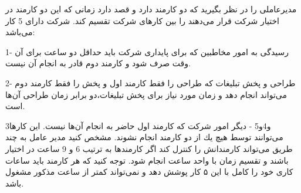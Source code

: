 \p
مدیرعاملی را در نظر بگیرید که دو کارمند دارد و قصد دارد زمانی که این دو کارمند در اختیار شرکت قرار می‌دهند را بین کار‌های شرکت تقسیم کند. شرکت دارای 5 کار می‌باشد:

1- رسیدگی به امور مخاطبین که برای پایداری شرکت باید حداقل دو ساعت برای آن وقت صرف شود و کارمند دوم قادر به انجام آن نیست.

2- طراحی و پخش تبلیغات که طراحی را فقط کارمند اول و پخش را فقط کارمند دوم می‌تواند انجام دهد و زمان مورد نیاز برای پخش تبلیغات،دو برابر زمان طراحی آن‌ها است.

3و4و5 - دیگر امور شرکت که کارمند اول حاضر به انجام آن‌ها نیست.
این کارها می‌توانند توسط هيچ يك از دو كارمند انجام نشوند.
\p
مشخص کنید مدیر عامل به چند طریق می‌تواند کارمندانش را کنترل کند اگر کارمند‌ها به ترتیب 6 و 9 ساعت در اختیار باشند و تقسیم زمان با واحد ساعت انجام شود.
توجه کنید که هر کارمند باید ساعات کاری خود را کامل با این ۵ کار پوشش دهد و نمی‌تواند کمتر از ساعت مذکور مشغول باشد.

